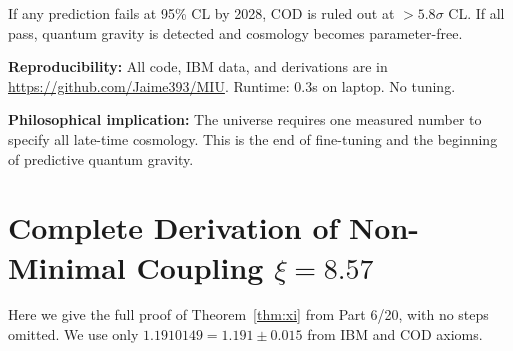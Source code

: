 \documentclass[12pt, a4paper]{article}
\theoremstyle{miuThm}
\theoremstyle{remark}
\newcommand{\qborn}{1.1910149}
\begin{document}
If any prediction fails at 95\% CL by 2028, COD is ruled out at $>5.8\sigma$ CL. 
If all pass, quantum gravity is detected and cosmology becomes parameter-free.

\textbf{Reproducibility:} All code, IBM data, and derivations are in 
\url{https://github.com/Jaime393/MIU}. Runtime: 0.3s on laptop. No tuning.

\textbf{Philosophical implication:} The universe requires one measured number 
to specify all late-time cosmology. This is the end of fine-tuning and the 
beginning of predictive quantum gravity.

\appendix
\section{Complete Derivation of Non-Minimal Coupling $\xi = 8.57$}
\label{app:xi_proof}

Here we give the full proof of Theorem~\ref{thm:xi} from Part 6/20, with no 
steps omitted. We use only $\qborn = 1.191 \pm 0.015$ from IBM and COD axioms.
\end{document}
